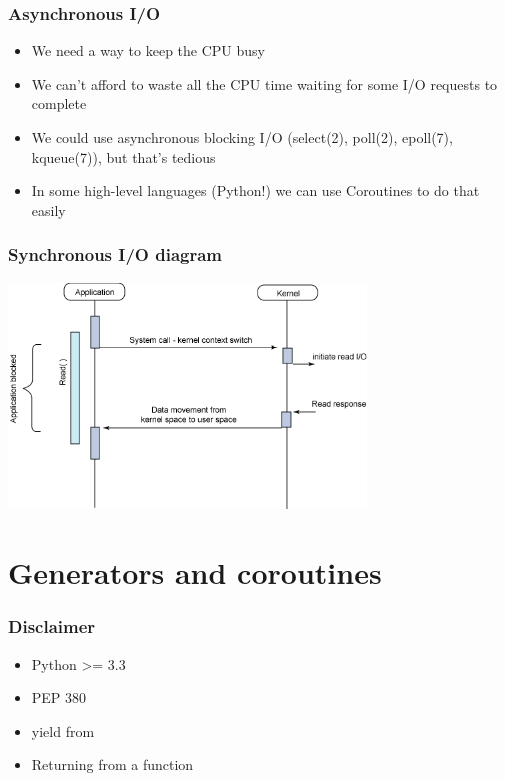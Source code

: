 \documentclass[ignorenonframetext,]{beamer}
\begin{document}
\begin{frame}[fragile]\frametitle{Asynchronous I/O}

\begin{itemize}
\itemsep1pt\parskip0pt
\item
  We need a way to keep the CPU busy
\item
  We can't afford to waste all the CPU time waiting for some I/O
  requests to complete
\item
  We could use asynchronous blocking I/O (select(2), poll(2), epoll(7),
  kqueue(7)), but that's tedious
\item
  In some high-level languages (Python!) we can use Coroutines to do
  that easily
\end{itemize}

\end{frame}

\begin{frame}[fragile]\frametitle{Synchronous I/O diagram}

\begin{center}
 \includegraphics[height=6cm]{img/synchronous.png}
\end{center}

\end{frame}

\section{Generators and coroutines}

\begin{frame}[fragile]\frametitle{Disclaimer}

\begin{itemize}
\itemsep1pt\parskip0pt
\item
  Python \textgreater{}= 3.3
\item
  PEP 380
\item
  yield from
\item
  Returning from a function
\end{itemize}

\end{frame}
\end{document}
